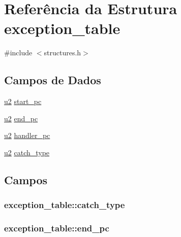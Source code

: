 \hypertarget{structexception__table}{}\section{Referência da Estrutura exception\+\_\+table}
\label{structexception__table}


{\ttfamily \#include $<$structures.\+h$>$}

\subsection*{Campos de Dados}
\begin{DoxyCompactItemize}
\item 
\hyperlink{lista__operandos_8h_a732cde1300aafb73b0ea6c2558a7a54f}{u2} \hyperlink{structexception__table_a63da93a2b0f5dc61b3a158a0c7384602}{start\+\_\+pc}
\item 
\hyperlink{lista__operandos_8h_a732cde1300aafb73b0ea6c2558a7a54f}{u2} \hyperlink{structexception__table_aeb4c86c92f02d6fccd52a0a9be9c5dac}{end\+\_\+pc}
\item 
\hyperlink{lista__operandos_8h_a732cde1300aafb73b0ea6c2558a7a54f}{u2} \hyperlink{structexception__table_a8fe6fb5063598ad0d48aab5e617d6a35}{handler\+\_\+pc}
\item 
\hyperlink{lista__operandos_8h_a732cde1300aafb73b0ea6c2558a7a54f}{u2} \hyperlink{structexception__table_ade50b30a987f3d3452a6de69eee0ada5}{catch\+\_\+type}
\end{DoxyCompactItemize}


\subsection{Campos}
\subsubsection[{\texorpdfstring{catch\+\_\+type}{catch_type}}]{ exception\+\_\+table\+::catch\+\_\+type}\hypertarget{structexception__table_ade50b30a987f3d3452a6de69eee0ada5}{}\label{structexception__table_ade50b30a987f3d3452a6de69eee0ada5}
\subsubsection[{\texorpdfstring{end\+\_\+pc}{end_pc}}]{ exception\+\_\+table\+::end\+\_\+pc}\hypertarget{structexception__table_aeb4c86c92f02d6fccd52a0a9be9c5dac}{}\label{structexception__table_aeb4c86c92f02d6fccd52a0a9be9c5dac}
